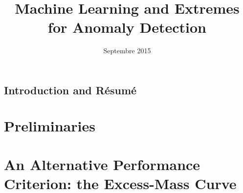 \documentclass{ecsthesis}      %
\begin{document}
\begingroup
  \makeatletter
  \let\BR@bibitem\BRatbibitem
  \nobibliography*
\endgroup
\frontmatter
\title      {Machine Learning and Extremes for Anomaly Detection}
\date       {Septembre 2015}
\subject    {PhD Thesis}
\maketitle

\tableofcontents
\listoffigures
\listoftables
%
%
%
%
%
%
%

\mainmatter
\chapter{Introduction and Résumé}\label{chap:intro}


\part{Preliminaries}\label{part:background}


\part{An Alternative Performance Criterion: the Excess-Mass Curve}\label{part:struct}

\end{document}
